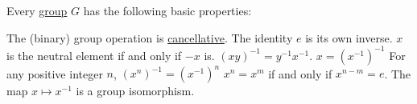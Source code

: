 \begin{proposition}\label{thm:def:group}
  Every \hyperref[def:group]{group} \( G \) has the following basic properties:
  \begin{thmenum}
     The (binary) group operation is \hyperref[def:binary_operation/cancellative]{cancellative}.
     The identity \( e \) is its own inverse.
     \( x \) is the neutral element if and only if \( -x \) is.
     \( (xy)^{-1} = y^{-1} x^{-1} \).
     \( x = (x^{-1})^{-1} \)
     For any positive integer \( n \), \( (x^n)^{-1} = (x^{-1})^n \)
     \( x^n = x^m \) if and only if \( x^{n-m} = e \).
     The map \( x \mapsto x^{-1} \) is a group isomorphism.
  \end{thmenum}
\end{proposition}
